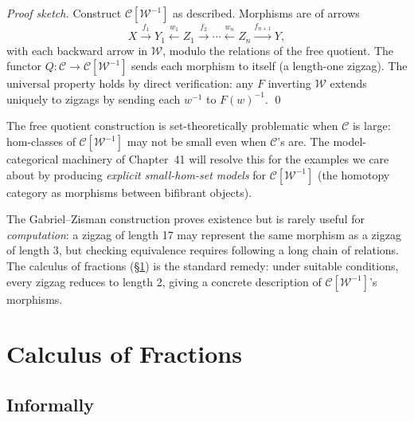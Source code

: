 \begin{proof}[Proof sketch]
Construct $\mathcal{C}[\mathcal{W}^{-1}]$ as described. Morphisms are
 of arrows
\begin{equation*}
  X \xrightarrow{f_1} Y_1 \xleftarrow{w_1} Z_1 \xrightarrow{f_2} \cdots \xleftarrow{w_n} Z_n \xrightarrow{f_{n+1}} Y,
\end{equation*}
with each backward arrow in $\mathcal{W}$, modulo the relations of the
free quotient. The functor $Q : \mathcal{C} \to \mathcal{C}[\mathcal{W}^{-1}]$
sends each morphism to itself (a length-one zigzag). The universal
property holds by direct verification: any $F$ inverting $\mathcal{W}$
extends uniquely to zigzags by sending each $w^{-1}$ to $F(w)^{-1}$.
\qed
\end{proof}

\begin{remark}
\label{rem:size-issues}
The free quotient construction is set-theoretically problematic when
$\mathcal{C}$ is large: hom-classes of $\mathcal{C}[\mathcal{W}^{-1}]$
may not be small even when $\mathcal{C}$'s are. The model-categorical
machinery of Chapter~41 will resolve this for the examples we care
about by producing \emph{explicit small-hom-set models} for
$\mathcal{C}[\mathcal{W}^{-1}]$ (the homotopy category as morphisms
between bifibrant objects).
\end{remark}

\begin{readernote}
The Gabriel--Zisman construction proves existence but is rarely useful
for \emph{computation}: a zigzag of length 17 may represent the same
morphism as a zigzag of length 3, but checking equivalence requires
following a long chain of relations. The calculus of fractions
(\S\ref{sec:calculus-of-fractions}) is the standard remedy: under
suitable conditions, every zigzag reduces to length 2, giving a
concrete description of $\mathcal{C}[\mathcal{W}^{-1}]$'s morphisms.
\end{readernote}


\section{Calculus of Fractions}
\label{sec:calculus-of-fractions}

\subsection{Informally}

